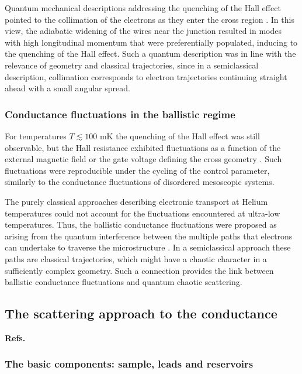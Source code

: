 \documentclass[a4paper,10pt]{article}
\newcommand{\nin}{\noindent}
\begin{document}
\nin Quantum mechanical descriptions addressing the quenching of the Hall effect pointed to the collimation of the electrons as they enter the cross region \cite{BarSto89}. In this view, the adiabatic widening of the wires near the junction resulted in modes with high longitudinal momentum that were preferentially populated, inducing to the quenching of the Hall effect. Such a quantum description was in line with the relevance of geometry and classical trajectories, since in a semiclassical description, collimation corresponds to electron trajectories continuing straight ahead with a small angular spread.

\subsubsection{Conductance fluctuations in the ballistic regime}

For temperatures $T \lesssim 100$ mK the quenching of the Hall effect was still observable, but the Hall resistance exhibited fluctuations as a function of the external magnetic field or the gate voltage defining the cross geometry \cite{Ford88}. Such fluctuations were reproducible under the cycling of the control parameter, similarly to the conductance fluctuations of disordered mesoscopic systems.

\nin The purely classical approaches describing electronic transport at Helium temperatures could not account for the fluctuations encountered at ultra-low temperatures. Thus, the ballistic conductance fluctuations were proposed as arising from the quantum interference between the multiple paths that electrons can undertake to traverse the microstructure \cite{Jal90}. In a semiclassical approach these paths are classical trajectories, which might have a chaotic character in a sufficiently complex geometry. Such a connection provides the link between ballistic conductance fluctuations and quantum chaotic scattering.

\medskip

\subsection{The scattering approach to the conductance}

{\bf Refs.~\cite{Imry86,buttiker88,buttiker93,revha,LesHouSt,jalabert00,mello04}}

\subsubsection{The basic components: sample, leads and reservoirs}
\end{document}
